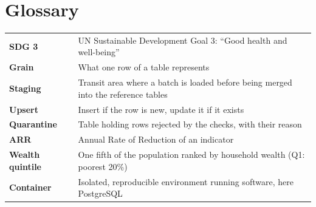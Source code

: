 \documentclass[11pt, a4paper, oneside, headings=normal, numbers=noenddot, DIV=12]{scrartcl}
\begin{document}
\section{Glossary}
\begin{tabularx}{\linewidth}{@{}>{\bfseries}L{3.6cm} Y@{}}
SDG 3 & UN Sustainable Development Goal 3: ``Good health and well-being'' \\
Grain & What one row of a table represents \\
Staging & Transit area where a batch is loaded before being merged into the reference tables \\
Upsert & Insert if the row is new, update it if it exists \\
Quarantine & Table holding rows rejected by the checks, with their reason \\
ARR & Annual Rate of Reduction of an indicator \\
Wealth quintile & One fifth of the population ranked by household wealth (Q1: poorest 20\%) \\
Container & Isolated, reproducible environment running software, here PostgreSQL \\
\end{tabularx}
\end{document}

